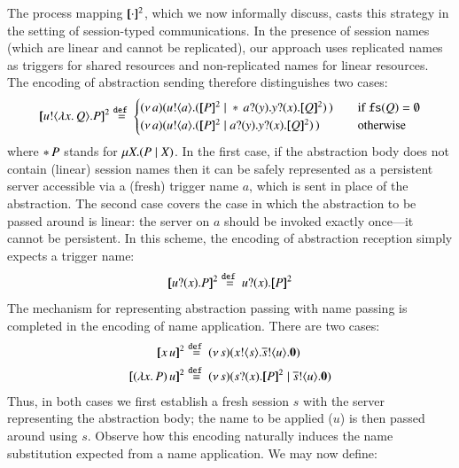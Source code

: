 \documentclass[preprint,11pt]{elsarticle}
\begin{document}
{{The process mapping $[\!\![\cdot]\!\!]^2$, which we now informally discuss,
casts this strategy in the setting of session-typed communications. 
In the presence of session names (which are linear  and cannot be replicated),
our
approach %
 uses replicated names
as triggers for shared resources and non-replicated names
for linear resources. The encoding of abstraction sending therefore distinguishes two cases:
$$
	\pmap{\bout{u}{\abs{x}{Q}} P}{2}  \defeq  
	\begin{cases}
		\newsp{a}{\bout{u}{a} (\pmap{P}{2} \Par \repl{} \binp{a}{y} \binp{y}{x} \pmap{Q}{2})\,}\quad
		& \text{if $\fs{Q} = \emptyset$}
		\\
		\newsp{a}{\bout{u}{a} (\pmap{P}{2} \Par \binp{a}{y} \binp{y}{x} \pmap{Q}{2})\,}\quad
		& \text{otherwise} %
	\end{cases}
	$$
	where  $\ast\,{} P$ stands for $\mu X. (P \;|\; X)$.
	In the first case, if the abstraction body does not contain (linear) session names then it can be safely 
	represented as a persistent server accessible via a (fresh) trigger name $a$, which is sent in place of the abstraction. The second case covers the case in which the abstraction to be passed around 
	is linear: the server on $a$ should be invoked exactly once---it cannot be persistent.
	In this scheme, the encoding of abstraction reception simply expects a trigger name:
   $$
   \pmap{\binp{u}{x} P}{2} \defeq  \binp{u}{x} \pmap{P}{2}
   $$
	The mechanism for representing abstraction passing with name passing is completed in the encoding of name application. There are two cases:
	\begin{align*}
		\pmap{\appl{x}{u}}{2} &\defeq \newsp{s}{\bout{x}{s} \bout{\dual{s}}{u} \inact}
	\\
	\pmap{\appl{(\abs{x}{P})}{u}}{2} & \defeq  %
	\newsp{s}{\binp{s}{x} \pmap{P}{2} \Par \bout{\dual{s}}{u} \inact}
\end{align*}
Thus,   in both cases we first establish a fresh session $s$   with the server representing the abstraction body;
the name to be applied ($u$) is then passed around using $s$.
Observe how %
this encoding
naturally induces the name substitution expected from a name application.
We may now define:


}}
\end{document}
